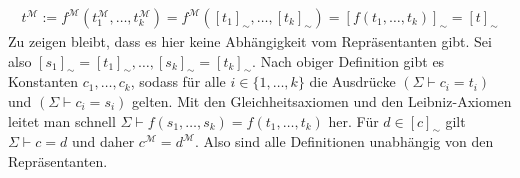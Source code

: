 \begin{solution}
\begin{align*}
t^\mathscr{M} := f^\mathscr{M}(t_1^\mathscr{M}, \dots, t_k^\mathscr{M}) = f^\mathscr{M}([t_1]_\sim, \dots, [t_k]_\sim) = [f(t_1, \dots, t_k)]_\sim = [t]_\sim
\end{align*} 
Zu zeigen bleibt, dass es hier keine Abhängigkeit vom Repräsentanten gibt. Sei also $[s_1]_\sim = [t_1]_\sim, \dots, [s_k]_\sim = [t_k]_\sim$. Nach obiger Definition gibt es Konstanten $c_1,\dots,c_k$, sodass für alle $i \in \{1, \dots, k\}$ die Ausdrücke
$(\Sigma \vdash c_i  = t_i)$ und $(\Sigma \vdash c_i  = s_i)$ gelten. Mit den Gleichheitsaxiomen und den Leibniz-Axiomen leitet man schnell $\Sigma \vdash f(s_1,\dots,s_k) = f(t_1,\dots,t_k)$ her. Für $d \in [c]_\sim$ gilt $\Sigma \vdash c = d$ und daher $c^\mathscr{M} = d^\mathscr{M}$. Also sind alle Definitionen unabhängig von den Repräsentanten.
\end{solution}


